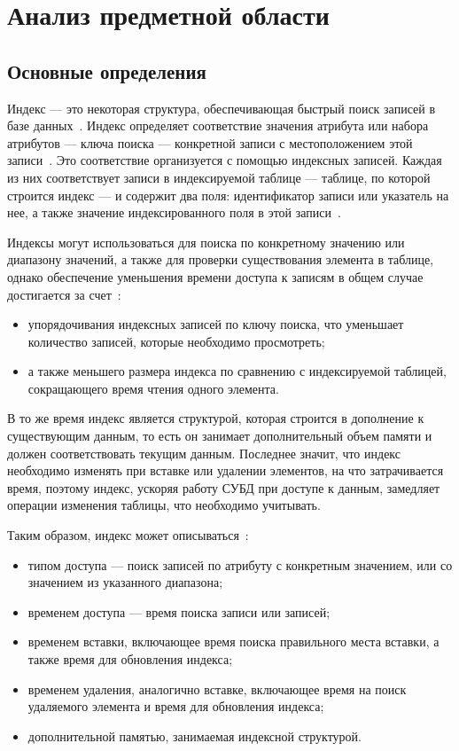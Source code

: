 \chapter{Анализ предметной области\label{analysis}}

\section{Основные определения}

Индекс --- это некоторая структура, обеспечивающая быстрый поиск
записей в базе данных~\cite{amur}. Индекс определяет соответствие значения
атрибута или набора атрибутов --- ключа поиска --- конкретной
записи с местоположением этой записи~\cite{ship}. Это соответствие организуется
с помощью индексных записей. Каждая из них соответствует записи в
индексируемой таблице --- таблице, по которой строится индекс --- и
содержит два поля: идентификатор записи или указатель на нее, а также значение
индексированного поля в этой записи~\cite{syore}.

Индексы могут использоваться для поиска по конкретному значению или диапазону
значений, а также для проверки существования элемента в таблице, однако
обеспечение уменьшения времени доступа к записям в общем случае достигается за
счет~\cite{ship}:
\begin{itemize}
    \item упорядочивания индексных записей по ключу поиска, что уменьшает
        количество записей, которые необходимо просмотреть;
    \item а также меньшего размера индекса по сравнению с индексируемой
        таблицей, сокращающего время чтения одного элемента.
\end{itemize}

В то же время индекс является структурой, которая строится в дополнение к
существующим данным, то есть он занимает дополнительный объем памяти и должен
соответствовать текущим данным.  Последнее значит, что индекс необходимо
изменять при вставке или удалении элементов, на что затрачивается время, поэтому
индекс, ускоряя работу СУБД при доступе к данным, замедляет операции изменения
таблицы, что необходимо учитывать\cite{osip}.

Таким образом, индекс может описываться~\cite{ship}:
\begin{itemize}
    \item типом доступа --- поиск записей по атрибуту с конкретным
        значением, или со значением из указанного диапазона;
    \item временем доступа --- время поиска записи или записей;
    \item временем вставки, включающее время поиска правильного места
        вставки, а также время для обновления индекса;
    \item временем удаления, аналогично вставке, включающее время на поиск
        удаляемого элемента и время для обновления индекса;
    \item дополнительной памятью, занимаемая индексной структурой.
\end{itemize}

